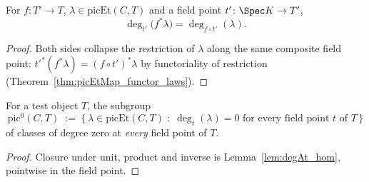 \begin{theorem}
  \label{thm:degAt_picEtMap}
  \leanok
  For \(f \colon T' \to T\), \(\lambda \in \mathrm{picEt}(C,T)\) and a field point
  \(t' \colon \Spec K \to T'\),
  \[
    \deg_{t'}\bigl(f^{*}\lambda\bigr) = \deg_{f \circ t'}(\lambda).
  \]
\end{theorem}
\begin{proof}
  \leanok
  Both sides collapse the restriction of \(\lambda\) along the same composite field point:
  \(t'^{*}(f^{*}\lambda) = (f \circ t')^{*}\lambda\) by functoriality of restriction
  (Theorem~\ref{thm:picEtMap_functor_laws}).
\end{proof}

\begin{definition}
  \label{def:pic0Subgroup}
  \leanok
  For a test object \(T\), the subgroup
  \[
    \mathrm{pic}^0(C,T) \;:=\;
    \bigl\{\, \lambda \in \mathrm{picEt}(C,T) \;:\; \deg_t(\lambda) = 0
      \text{ for every field point } t \text{ of } T \,\bigr\}
  \]
  of classes of degree zero at \emph{every} field point of \(T\).
\end{definition}
\begin{proof}
  \leanok
  Closure under unit, product and inverse is Lemma~\ref{lem:degAt_hom}, pointwise in the
  field point.
\end{proof}

